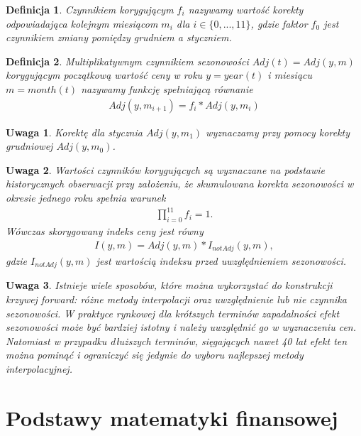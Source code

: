 \documentclass{mini}
\theoremstyle{mythstyle}
\newtheorem{Definicja}{Definicja}[chapter]
\newtheorem{Uwaga}{Uwaga}[chapter]
\begin{document}
	\begin{Definicja}
		Czynnikiem korygującym $f_i$ nazywamy wartość korekty odpowiadająca kolejnym miesiącom $m_i$ dla $i \in \{0,...,11\}$, gdzie faktor $f_0$ jest czynnikiem zmiany pomiędzy grudniem a styczniem.\\
	\end{Definicja}
	
	\begin{Definicja}
		Multiplikatywnym czynnikiem sezonowości $Adj(t) = Adj(y,m)$ korygującym początkową wartość ceny w roku $y = year(t)$ i miesiącu $m = month(t)$ nazywamy funkcję spełniającą równanie
		\begin{eqnarray*}
			Adj(y, m_{i+1})  = f_i * Adj(y, m_i)
		\end{eqnarray*}
	\end{Definicja}

	\begin{Uwaga}
		Korektę dla stycznia $Adj(y, m_1)$ wyznaczamy przy pomocy korekty grudniowej $Adj(y, m_0)$.\\
	\end{Uwaga}

	\begin{Uwaga}
		 Wartości czynników korygujących są wyznaczane na podstawie historycznych obserwacji przy założeniu, że skumulowana korekta sezonowości w okresie jednego roku spełnia warunek
		\begin{eqnarray*}
			\prod_{i=0}^{11} f_i = 1.
		\end{eqnarray*}
		Wówczas skorygowany indeks ceny jest równy
		\begin{eqnarray*}
			I(y,m) = Adj(y,m) * I_{notAdj}(y,m),
		\end{eqnarray*}
		gdzie $I_{notAdj}(y,m)$ jest wartością indeksu przed uwzględnieniem sezonowości.\\
	\end{Uwaga}
		
	\begin{Uwaga}
		Istnieje wiele sposobów, które można wykorzystać do konstrukcji krzywej forward: różne metody interpolacji oraz uwzględnienie lub nie czynnika sezonowości. W praktyce rynkowej dla krótszych terminów zapadalności efekt sezonowości może być bardziej istotny i należy uwzględnić go w wyznaczeniu cen. Natomiast w przypadku dłuższych terminów, sięgających nawet 40 lat efekt ten można pominąć i ograniczyć się jedynie do wyboru najlepszej metody interpolacyjnej.
	\end{Uwaga}

\chapter{Podstawy matematyki finansowej}
\end{document}
